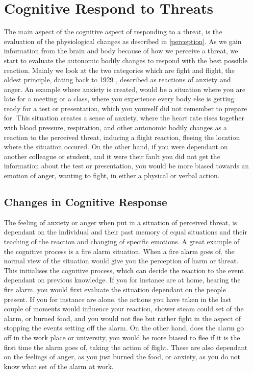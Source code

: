 \section{Cognitive Respond to Threats}\label{cognition}
The main aspect of the cognitive aspect of responding to a threat, is the evaluation of the physiological changes as described in \ref{perception}. As we gain information from the brain and body because of how we perceive a threat, we start to evaluate the autonomic bodily changes to respond with the best possible reaction. Mainly we look at the two categories which are fight and flight, the oldest principle, dating back to 1929 \cite{bodily_changes}, described as reactions of anxiety and anger. An example where anxiety is created, would be a situation where you are late for a meeting or a class, where you experience every body else is getting ready for a test or presentation, which you yourself did not remember to prepare for. This situation creates a sense of anxiety, where the heart rate rises together with blood pressure, respiration, and other autonomic bodily changes as a reaction to the perceived threat, inducing a flight reaction, fleeing the location where the situation occured. On the other hand, if you were dependant on another colleague or student, and it were their fault you did not get the information about the test or presentation, you would be more biased towards an emotion of anger, wanting to fight, in either a physical or verbal action. \cite{bodily_changes}

\subsection{Changes in Cognitive Response}\label{cognitive_response}
The feeling of anxiety or anger when put in a situation of perceived threat, is dependant on the individual and their past memory of equal situations and their teaching of the reaction and changing of specific emotions. A great example of the cognitive process is a fire alarm situation. When a fire alarm goes of, the normal view of the situation would give you the 
perception of harm or threat. This initialises the cognitive process, which can decide the reaction to the event dependant on previous knowledge. If you for instance are at home, hearing the fire alarm, you would first evaluate the situation dependant on the people present. If you for instance are alone, the actions you have taken in the last couple of moments would influence your reaction, shower steam could set of the alarm, or burned food, and you would not flee but rather fight in the aspect of stopping the events setting off the alarm. On the other hand, does the alarm go off in the work place or university, you would be more biased to flee if it is the first time the alarm goes of, taking the action of flight. These are also dependant on the feelings of anger, as you just burned the food, or anxiety, as you do not know what set of the alarm at work.\cite{bodily_changes}

